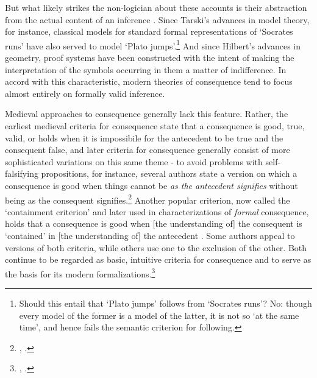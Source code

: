 \documentclass[]{article}
\begin{document}
But what likely strikes the non-logician about these accounts is their abstraction from the actual content of an inference \autocite{DutilhNovaes2011}. Since Tarski's advances in model theory, for instance, classical models for standard formal representations of `Socrates runs' have also served to model `Plato jumps'.\footnote{Should this entail that `Plato jumps' follows from `Socrates runs'? No: though every model of the former is a model of the latter, it is not so `at the same time', and hence fails the semantic criterion for following.} And since Hilbert's advances in geometry, proof systems have been constructed with the intent of making the interpretation of the symbols occurring in them a matter of indifference. In accord with this characteristic, modern theories of consequence tend to focus almost entirely on formally valid inference.

Medieval approaches to consequence generally lack this feature. Rather, the earliest medieval criteria for consequence state that a consequence is good, true, valid, or holds when it is impossibile for the antecedent to be true and the consequent false, and later criteria for consequence generally consist of more sophisticated variations on this same theme - to avoid problems with self-falsifying propositions, for instance, several authors state a version on which a consequence is good when things cannot be \textit{as the antecedent signifies} without being as the consequent signifies.\footnote{\autocite[I, c. 3, pp. 20-22]{BuridanTC}, \autocite[I, q. 10, pp. 103-105]{Pseudo-Scotus1891}.} Another popular criterion, now called the `containment criterion' and later used in characterizations of \textit{formal} consequence, holds that a consequence is good when [the understanding of] the consequent is `contained' in [the understanding of] the antecedent \autocite[pp. 283-284]{AbelardDialectica}. Some authors appeal to versions of both criteria, while others use one to the exclusion of the other. Both continue to be regarded as basic, intuitive criteria for consequence and to serve as the basis for its modern formalizations.\footnote{\autocite[esp. pp. 218-219]{Saguillo1997}, \autocite{Fine2017a,Halbach2018,Prawitz2018}.}
\end{document}
